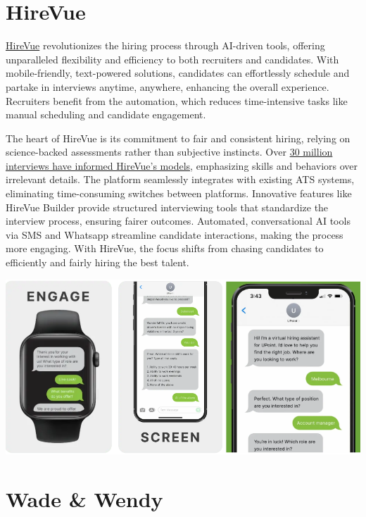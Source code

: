 \documentclass[
]{book}
\begin{document}
\hypertarget{hirevue}{%
\section{HireVue}\label{hirevue}}

\href{https://www.hirevue.com/}{HireVue} revolutionizes the hiring process through AI-driven tools, offering unparalleled flexibility and efficiency to both recruiters and candidates. With mobile-friendly, text-powered solutions, candidates can effortlessly schedule and partake in interviews anytime, anywhere, enhancing the overall experience. Recruiters benefit from the automation, which reduces time-intensive tasks like manual scheduling and candidate engagement.

The heart of HireVue is its commitment to fair and consistent hiring, relying on science-backed assessments rather than subjective instincts. Over \href{https://www.hirevue.com/our-science}{30 million interviews have informed HireVue's models}, emphasizing skills and behaviors over irrelevant details. The platform seamlessly integrates with existing ATS systems, eliminating time-consuming switches between platforms. Innovative features like HireVue Builder provide structured interviewing tools that standardize the interview process, ensuring fairer outcomes. Automated, conversational AI tools via SMS and Whatsapp streamline candidate interactions, making the process more engaging. With HireVue, the focus shifts from chasing candidates to efficiently and fairly hiring the best talent.

\includegraphics[width=5.57292in,height=\textheight]{hirevue pic.png}

\hypertarget{wade-wendy}{%
\section{Wade \& Wendy}\label{wade-wendy}}
\end{document}

